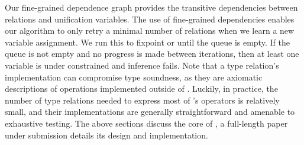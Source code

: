   Our fine-grained dependence graph provides the transitive dependencies
    between relations and unification variables.
  The use of fine-grained dependencies enables our algorithm to
    only retry a minimal number of relations when we
    learn a new variable assignment.
  We run this to fixpoint or until the queue is empty.
  If the queue is not empty and no progress is made between iterations,
    then at least one variable is under constrained and inference fails.
  Note that a type relation's implementation can
    compromise type soundness, as they are axiomatic descriptions
    of operations implemented outside of \relay.
  Luckily, in practice, the number of type relations needed to express most of \relay's
    operators is relatively small, and their implementations are generally straightforward
    and amenable to exhaustive testing.
The above sections discuss the core of \relay, a full-length paper under submission\citep{relay_arixv}
  details its design and implementation.
